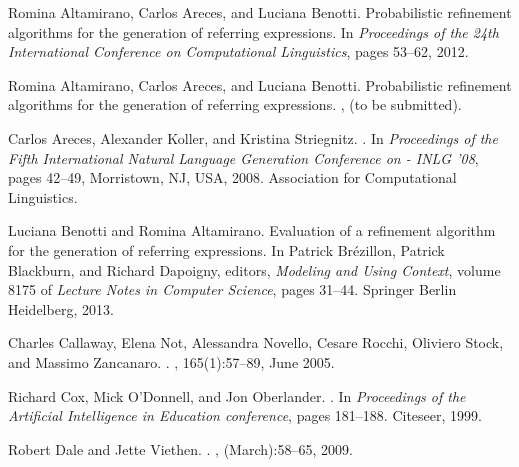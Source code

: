 \documentclass[a4paper,12pt]{article}
\begin{document}
\begin{thebibliography}{10} \renewcommand{\itemsep}{-2pt}

Romina Altamirano, Carlos Areces, and Luciana Benotti.
\newblock Probabilistic refinement algorithms for the generation of referring
  expressions.
\newblock In {\em Proceedings of the 24th International Conference on
  Computational Linguistics}, pages 53--62, 2012.

Romina Altamirano, Carlos Areces, and Luciana Benotti.
\newblock Probabilistic refinement algorithms for the generation of referring
  expressions.
, (to be submitted).

Carlos Areces, Alexander Koller, and Kristina Striegnitz.
.
\newblock In {\em Proceedings of the Fifth International Natural Language
  Generation Conference on - INLG '08}, pages 42--49, Morristown, NJ, USA,
  2008. Association for Computational Linguistics.

Luciana Benotti and Romina Altamirano.
\newblock Evaluation of a refinement algorithm for the generation of referring
  expressions.
\newblock In Patrick Br\'ezillon, Patrick Blackburn, and Richard Dapoigny,
  editors, {\em Modeling and Using Context}, volume 8175 of {\em Lecture Notes
  in Computer Science}, pages 31--44. Springer Berlin Heidelberg, 2013.

Charles Callaway, Elena Not, Alessandra Novello, Cesare Rocchi, Oliviero Stock,
  and Massimo Zancanaro.
.
, 165(1):57--89, June 2005.

Richard Cox, Mick O'Donnell, and Jon Oberlander.
.
\newblock In {\em Proceedings of the Artificial Intelligence in Education
  conference}, pages 181--188. Citeseer, 1999.

Robert Dale and Jette Viethen.
.
, (March):58--65, 2009.


\end{thebibliography}
\end{document}
